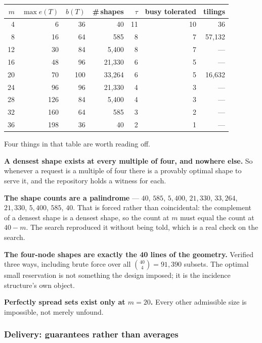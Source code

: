 \documentclass[11pt,letterpaper]{article}
\begin{document}
\begin{center}
\renewcommand{\arraystretch}{1.2}
\begin{tabular}{rrrrrrr}
\toprule
$m$ & $\max e(T)$ & $b(T)$ & \#\,shapes & $\tau$ & \textbf{busy tolerated} & tilings \\
\midrule
4 & 6 & 36 & 40 & 11 & 10 & 36 \\
8 & 16 & 64 & 585 & 8 & 7 & 57,132 \\
12 & 30 & 84 & 5,400 & 8 & 7 & --- \\
16 & 48 & 96 & 21,330 & 6 & 5 & --- \\
20 & 70 & 100 & 33,264 & 6 & 5 & 16,632 \\
24 & 96 & 96 & 21,330 & 4 & 3 & --- \\
28 & 126 & 84 & 5,400 & 4 & 3 & --- \\
32 & 160 & 64 & 585 & 3 & 2 & --- \\
36 & 198 & 36 & 40 & 2 & 1 & --- \\
\bottomrule
\end{tabular}
\end{center}

Four things in that table are worth reading off.

\textbf{A densest shape exists at every multiple of four, and nowhere else.} So
whenever a request is a multiple of four there is a provably optimal shape to
serve it, and the repository holds a witness for each.

\textbf{The shape counts are a palindrome} --- $40$, $585$, $5{,}400$,
$21{,}330$, $33{,}264$, $21{,}330$, $5{,}400$, $585$, $40$. That is forced
rather than coincidental: the complement of a densest shape is a densest shape,
so the count at $m$ must equal the count at $40-m$. The search reproduced it
without being told, which is a real check on the search.

\textbf{The four-node shapes are exactly the 40 lines of the geometry.} Verified
three ways, including brute force over all $\binom{40}{4}=91{,}390$ subsets. The
optimal small reservation is not something the design imposed; it is the
incidence structure's own object.

\textbf{Perfectly spread sets exist only at $m=20$.} Every other admissible size
is impossible, not merely unfound.

\subsubsection{Delivery: guarantees rather than averages}
\end{document}
